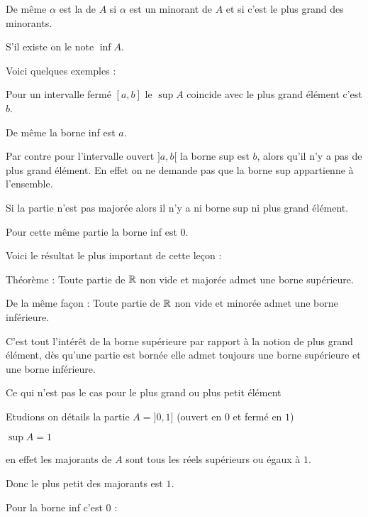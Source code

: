 De même  $\alpha$ est la  de $A$ si $\alpha$ est un minorant de 
$A$ et si c'est le plus grand des minorants. 

S'il existe on le note $\inf A$.

\change

Voici quelques exemples :


Pour un intervalle fermé $[a,b]$ le $\sup A$ coincide avec le plus grand élément c'est $b$.

De même la borne inf est $a$.

Par contre pour  l'intervalle ouvert $]a,b[$ la borne sup est $b$, alors qu'il n'y a pas de plus grand élément.
En effet on ne demande pas que la borne sup appartienne à l'ensemble.


Si la partie n'est pas majorée alors il n'y a ni borne sup ni plus grand élément.

Pour cette même partie la borne inf est $0$.



\diapo


Voici le résultat le plus important de cette leçon :

Théorème : Toute partie de $\mathbb{R}$ non vide et majorée admet une borne supérieure.

\change

De la même façon : Toute partie de $\mathbb{R}$ non vide et minorée admet une borne inférieure.


C'est tout l'intérêt de la borne supérieure par rapport à la notion de plus grand élément,
dès qu'une partie est bornée elle admet toujours une borne supérieure et une borne inférieure. 


Ce qui n'est pas le cas pour le plus grand ou plus petit élément

\change

Etudions on détails la partie $A=]0,1]$ (ouvert en $0$ et fermé en $1$)

\change

 $\sup A=1$ 

\change

 en effet les majorants de $A$ sont tous les réels  supérieurs ou égaux à $1$.

\change

Donc le plus petit des majorants est $1$.

\change

  Pour la borne inf c'est $0$ :

\change

